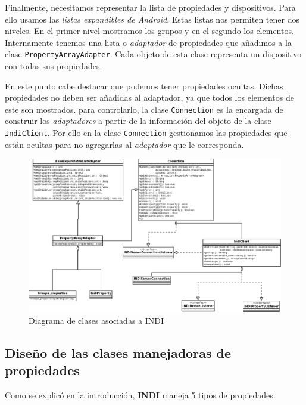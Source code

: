 \bigskip
Finalmente, necesitamos representar la lista de propiedades y dispositivos. Para ello usamos las \textit{listas expandibles de Android}\cite{AELVT}. Estas listas nos permiten tener dos niveles. En el primer nivel mostramos los grupos y en el segundo los elementos. Internamente tenemos una lista o \textit{adaptador} de propiedades que añadimos a la clase \texttt{PropertyArrayAdapter}. Cada objeto de esta clase representa un dispositivo con todas sus propiedades. 

\bigskip
En este punto cabe destacar que podemos tener propiedades ocultas. Dichas propiedades no deben ser añadidas al adaptador, ya que todos los elementos de este son mostrados. para controlarlo, la clase \texttt{Connection} es la encargada de construir los \textit{adaptadores} a partir de la información del objeto de la clase \texttt{IndiClient}. Por ello en la clase \texttt{Connection} gestionamos las propiedades que están ocultas para no agregarlas al \textit{adaptador} que le corresponda.


\bigskip
\begin{figure}[!ht]
  \begin{center}
  \includegraphics[width=1\textwidth]{../images/indi_diag_clases.png}
  \caption{Diagrama de clases asociadas a INDI}
  \label{fig:diag_indi_clases}
  \end{center}
\end{figure}


\newpage
\subsection{Diseño de las clases manejadoras de propiedades}

Como se explicó en la introducción, \textbf{INDI} maneja 5 tipos de propiedades:


